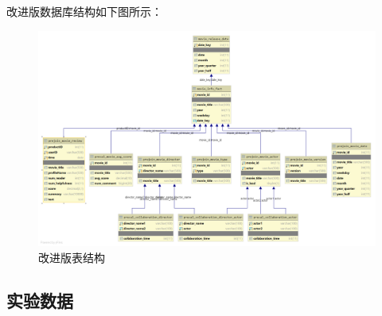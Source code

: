 \documentclass{ctexrep}
\begin{document}
    改进版数据库结构如下图所示：
    \begin{figure}[H]
		\centering
		\includegraphics[width=0.7\linewidth]{img/MySQL_DB2.png}
		\caption{改进版表结构}
		\label{fig:MySQL_DB2}
	\end{figure}
	\subsection{实验数据}
\end{document}

